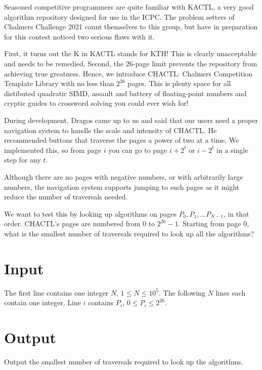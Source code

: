 Seasoned competitive programmers are quite familiar with \textsc{KACTL}, a very good algorithm repository
designed for use in the ICPC. The problem setters of Chalmers Challenge 2021 count themselves to
this group, but have in preparation for this contest noticed two serious flaws with it.

First, it turns out the \textsc{K} in \textsc{KACTL} stands for \textsc{KTH}! This is clearly
unacceptable and needs to be remedied. Second, the $26$-page limit prevents the repository from
achieving true greatness. Hence, we introduce \textsc{CHACTL}: Chalmers Competition Template Library
with no less than $2^{26}$ pages. This is plenty space for all distibuted quadratic SIMD, assault and
battery of floating-point numbers and cryptic guides to crossword solving you could ever wish for!

During development, Dragos came up to us and said that our users need a proper navigation system to
handle the scale and intensity of \textsc{CHACTL}. He recommended buttons that traverse the pages a
power of two at a time. We implemented this, so from page $i$ you can go to page $i + 2^t$ or $i -
2^t$ in a single step for any $t$.

Although there are no pages with negative numbers, or with arbitrarily large numbers, the navigation
system supports jumping to such pages as it might reduce the number of traversals needed.

We want to test this by looking up algorithms on pages $P_0, P_1, \ldots P_{N-1}$, in that order.
\textsc{CHACTL}'s pages are numbered from $0$ to $2^{26} - 1$. Starting from page $0$, what is the
smallest number of traversals required to look up all the algorithms?

\section*{Input}
The first line contains one integer $N$, $1 \le N \le 10^5$. The following $N$ lines each contain
one integer. Line $i$ contains $P_i$, $0 \le P_i \le 2^{26}$.

\section*{Output}
Output the smallest number of traversals required to look up the algorithms.
